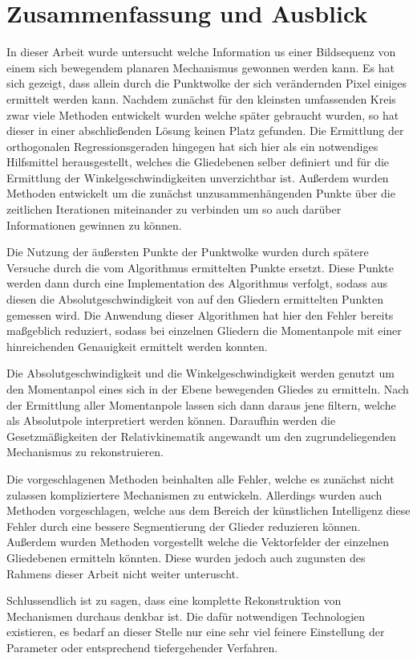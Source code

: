 
\chapter{Zusammenfassung und Ausblick} \label{ch:zusammenfassung_ausblick}

In dieser Arbeit wurde untersucht welche Information us einer Bildsequenz von einem sich bewegendem planaren Mechanismus gewonnen werden kann.
Es hat sich gezeigt, dass allein durch die Punktwolke der sich verändernden Pixel einiges ermittelt werden kann.
Nachdem zunächst für den kleinsten umfassenden Kreis zwar viele Methoden entwickelt wurden welche später gebraucht wurden, so hat dieser in einer abschlie{\ss}enden Lösung keinen Platz gefunden.
Die Ermittlung der orthogonalen Regressionsgeraden hingegen hat sich hier als ein notwendiges Hilfsmittel herausgestellt, welches die Gliedebenen selber definiert und für die Ermittlung der Winkelgeschwindigkeiten unverzichtbar ist.
Au{\ss}erdem wurden Methoden entwickelt um die zunächst unzusammenhängenden Punkte über die zeitlichen Iterationen miteinander zu verbinden um so auch darüber Informationen gewinnen zu können.

Die Nutzung der äu{\ss}ersten Punkte der Punktwolke wurden durch spätere Versuche durch die vom  Algorithmus ermittelten Punkte ersetzt.
Diese Punkte werden dann durch eine Implementation des  Algorithmus verfolgt, sodass aus diesen die Absolutgeschwindigkeit von auf den Gliedern ermittelten Punkten gemessen wird.
Die Anwendung dieser Algorithmen hat hier den Fehler bereits ma{\ss}geblich reduziert, sodass bei einzelnen Gliedern die Momentanpole mit einer hinreichenden Genauigkeit ermittelt werden konnten.

Die Absolutgeschwindigkeit und die Winkelgeschwindigkeit werden genutzt um den Momentanpol eines sich in der Ebene bewegenden Gliedes zu ermitteln.
Nach der Ermittlung aller Momentanpole lassen sich dann daraus jene filtern, welche als Absolutpole interpretiert werden können.
Daraufhin werden die Gesetzmä{\ss}igkeiten der Relativkinematik angewandt um den zugrundeliegenden Mechanismus zu rekonstruieren.

Die vorgeschlagenen Methoden beinhalten alle Fehler, welche es zunächst nicht zulassen kompliziertere Mechanismen zu entwickeln.
Allerdings wurden auch Methoden vorgeschlagen, welche aus dem Bereich der künstlichen Intelligenz diese Fehler durch eine bessere Segmentierung der Glieder reduzieren können.
Au{\ss}erdem wurden Methoden vorgestellt welche die Vektorfelder der einzelnen Gliedebenen ermitteln könnten.
Diese wurden jedoch auch zugunsten des Rahmens dieser Arbeit nicht weiter unteruscht.

Schlussendlich ist zu sagen, dass eine komplette Rekonstruktion von Mechanismen durchaus denkbar ist.
Die dafür notwendigen Technologien existieren, es bedarf an dieser Stelle nur eine sehr viel feinere Einstellung der Parameter oder entsprechend tiefergehender Verfahren.
